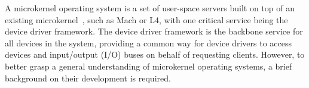 
A microkernel operating system is a set of user-space servers built on top of
an existing microkernel~\cite{stallings2005}, such as Mach or L4, with one
critical service being the device driver framework.  The device driver
framework is the backbone service for all devices in the system, providing
a common way for device drivers to access devices and input/output (I/O)
buses on behalf of requesting clients.  However, to better grasp a
general understanding of microkernel operating systems, a brief background
on their development is required.




